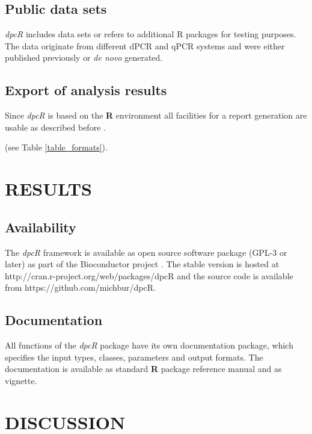 \documentclass[a4,center,fleqn]{NAR}
\begin{document}
\subsection{Public data sets}

\textit{dpcR} includes data sets or refers to additional R packages for testing 
purposes. The data originate from different dPCR and qPCR systems and were 
either published previously \cite{whale_comparison_2012, 
roediger2015chippcr, white_digital_2009, rodiger_r_2015} or \textit{de novo} generated.

\subsection{Export of analysis results}

Since \textit{dpcR} is based on the \textbf{R} environment all facilities for a 
report generation are usable as described before \cite{rodiger_r_2015}.

(see Table \ref{table_formats}).


\section{RESULTS}

\subsection{Availability}

The \textit{dpcR} framework is available as open source software package (GPL-3 
or later) as part of the Bioconductor project \cite{gentleman_2004}. The stable 
version is hosted at http://cran.r-project.org/web/packages/dpcR and the source 
code is available from  https://github.com/michbur/dpcR.

\subsection{Documentation}

All functions of the \textit{dpcR} package have its own documentation package, 
which specifies the input types, classes, parameters and output formats. The 
documentation is available as standard \textbf{R} package reference manual and 
as vignette.

\section{DISCUSSION}
\end{document}

